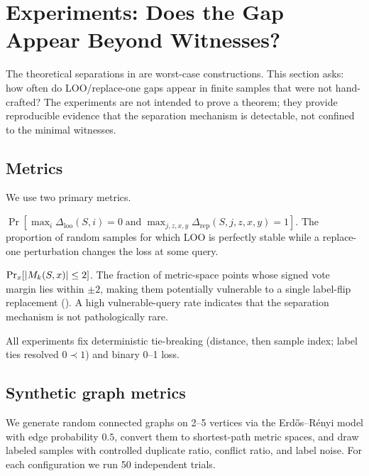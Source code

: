 \section{Experiments: Does the Gap Appear Beyond Witnesses?}
\label{sec:experiments}

The theoretical separations in
 are
worst-case constructions.  This section asks: how often do LOO/replace-one gaps
appear in finite samples that were not hand-crafted?  The experiments are not
intended to prove a theorem; they provide reproducible evidence that the
separation mechanism is detectable, not confined to the minimal witnesses.

\subsection{Metrics}

We use two primary metrics.

\begin{description}[leftmargin=*,style=nextline]
    \item[Strict separation frequency]
        $\Pr[\max_i \Delta_{\mathrm{loo}}(S,i) = 0 \;\text{and}\;
        \max_{j,z,x,y} \Delta_{\mathrm{rep}}(S,j,z,x,y) = 1]$.
        The proportion of random samples for which LOO is perfectly stable
        while a replace-one perturbation changes the loss at some query.
    \item[Vulnerable-query rate]
        $\Pr_x[|M_k(S,x)| \le 2]$.
        The fraction of metric-space points whose signed vote margin lies
        within $\pm 2$, making them potentially vulnerable to a single
        label-flip replacement ().  A high vulnerable-query rate
        indicates that the separation mechanism is not pathologically rare.
\end{description}

All experiments fix deterministic tie-breaking (distance, then sample index;
label ties resolved $0 \prec 1$) and binary 0--1 loss.

\subsection{Synthetic graph metrics}

We generate random connected graphs on 2--5 vertices via the
Erd\H{o}s--R\'enyi model with edge probability $0.5$, convert them to
shortest-path metric spaces, and draw labeled samples with controlled duplicate
ratio, conflict ratio, and label noise.  For each configuration we run 50
independent trials.

